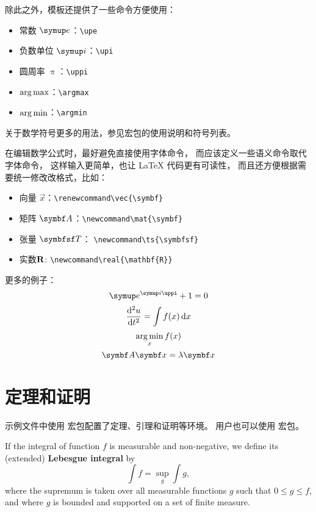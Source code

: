 除此之外，模板还提供了一些命令方便使用：
\begin{itemize}
  \item 常数 $\upe$：\verb|\upe|
  \item 负数单位 $\upi$：\verb|\upi|
  \item 圆周率 $\uppi$：\verb|\uppi|
  \item $\operatorname*{arg\,max}$：\verb|\argmax|
  \item $\operatorname*{arg\,min}$：\verb|\argmin|
\end{itemize}

关于数学符号更多的用法，参见宏包的使用说明和符号列表。

在编辑数学公式时，最好避免直接使用字体命令，
而应该定义一些语义命令取代字体命令，
这样输入更简单，也让 \LaTeX{} 代码更有可读性，
而且还方便根据需要统一修改改格式，比如：
\begin{itemize}
  \item 向量 $\vec{x}$：\verb|\renewcommand\vec{\symbf}|
  \item 矩阵 $\mat{A}$：\verb|\newcommand\mat{\symbf}|
  \item 张量 $\ts{T}$： \verb|\newcommand\ts{\symbfsf}|
  \item 实数$\real$: \verb|\newcommand\real{\mathbf{R}}|
\end{itemize}

更多的例子：
\begin{equation}
  \upe^{\upi\uppi} + 1 = 0
\end{equation}
\begin{equation}
  \frac{\mathop{}\!\mathrm{d}^2 u}{\mathop{}\!\mathrm{d} t^2} = \int f(x) \mathop{}\!\mathrm{d} x
\end{equation}
\begin{equation}
  \operatorname*{arg\,min}_x f(x)
\end{equation}
\begin{equation}
  \mat{A} \vec{x} = \lambda \vec{x}
\end{equation}



\section{定理和证明}

示例文件中使用  宏包配置了定理、引理和证明等环境。
用户也可以使用   宏包。

\begin{definition}
  If the integral of function $f$ is measurable and non-negative, we define
  its (extended) \textbf{Lebesgue integral} by
  \begin{equation}
    \int f = \sup_g \int g,
  \end{equation}
  where the supremum is taken over all measurable functions $g$ such that
  $0 \le g \le f$, and where $g$ is bounded and supported on a set of
  finite measure.
\end{definition}

